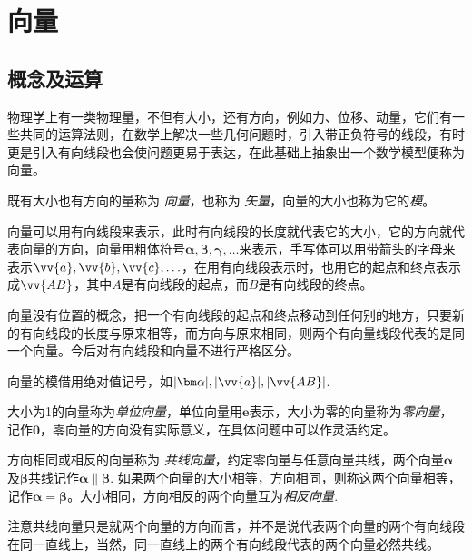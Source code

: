 
\section{向量}
\label{sec:vector}

\subsection{概念及运算}
\label{sec:vector-and-its-operation}


物理学上有一类物理量，不但有大小，还有方向，例如力、位移、动量，它们有一些共同的运算法则，在数学上解决一些几何问题时，引入带正负符号的线段，有时更是引入有向线段也会使问题更易于表达，在此基础上抽象出一个数学模型便称为向量。

\begin{definition}
  既有大小也有方向的量称为 \emph{向量}，也称为 \emph{矢量}，向量的大小也称为它的\emph{模}。
\end{definition}

向量可以用有向线段来表示，此时有向线段的长度就代表它的大小，它的方向就代表向量的方向，向量用粗体符号$\bm \alpha, \bm \beta, \bm \gamma, \ldots$来表示，手写体可以用带箭头的字母来表示$\vv{a}, \vv{b},\vv{c},\ldots$，在用有向线段表示时，也用它的起点和终点表示成$\vv{AB}$，其中$A$是有向线段的起点，而$B$是有向线段的终点。

向量没有位置的概念，把一个有向线段的起点和终点移动到任何别的地方，只要新的有向线段的长度与原来相等，而方向与原来相同，则两个有向量线段代表的是同一个向量。今后对有向线段和向量不进行严格区分。

向量的模借用绝对值记号，如$|\bm \alpha|,|\vv{a}|,|\vv{AB}|$.

\begin{definition}
大小为1的向量称为\emph{单位向量}，单位向量用$\bm{e}$表示，大小为零的向量称为\emph{零向量}，记作$\bm{0}$，零向量的方向没有实际意义，在具体问题中可以作灵活约定。
\end{definition}

\begin{definition}
  方向相同或相反的向量称为 \emph{共线向量}，约定零向量与任意向量共线，两个向量$\bm{\alpha}$及$\bm{\beta}$共线记作$\bm{\alpha} \parallel \bm{\beta}$. 如果两个向量的大小相等，方向相同，则称这两个向量相等，记作$\bm{\alpha}=\bm{\beta}$。大小相同，方向相反的两个向量互为\emph{相反向量}.
\end{definition}

注意共线向量只是就两个向量的方向而言，并不是说代表两个向量的两个有向线段在同一直线上，当然，同一直线上的两个有向线段代表的两个向量必然共线。

